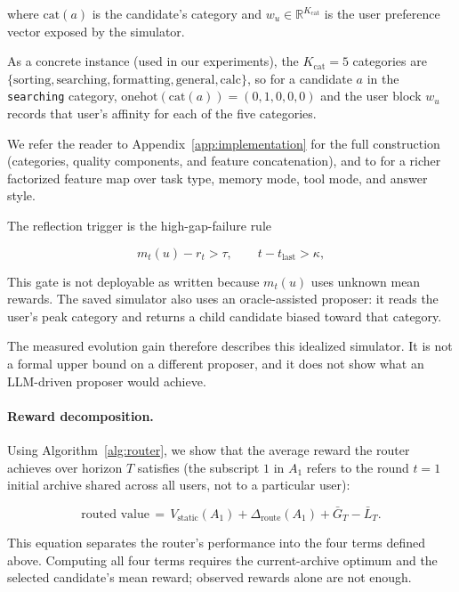 \documentclass{article} %
\begin{document}
where $\mathrm{cat}(a)$ is the candidate's category and $w_u \in \mathbb{R}^{K_{\mathrm{cat}}}$ is the user preference vector exposed by the simulator.

As a concrete instance (used in our experiments), the $K_{\mathrm{cat}}=5$ categories are $\{\text{sorting}, \text{searching}, \text{formatting}, \text{general}, \text{calc}\}$, so for a candidate $a$ in the \texttt{searching} category, $\mathrm{onehot}(\mathrm{cat}(a))=(0,1,0,0,0)$ and the user block $w_u$ records that user's affinity for each of the five categories.

We refer the reader to Appendix~\ref{app:implementation} for the full construction (categories, quality components, and feature concatenation), and to \citet{jin2026personalizing} for a richer factorized feature map over task type, memory mode, tool mode, and answer style.

The reflection trigger is the high-gap-failure rule

\begin{equation}
\label{eq:method-trigger}
m_t(u) - r_t > \tau,\qquad t - t_{\mathrm{last}} > \kappa,
\end{equation}

This gate is not deployable as written because $m_t(u)$ uses unknown mean rewards. The saved simulator also uses an oracle-assisted proposer: it reads the user's peak category and returns a child candidate biased toward that category.

The measured evolution gain therefore describes this idealized simulator. It is not a formal upper bound on a different proposer, and it does not show what an LLM-driven proposer would achieve.

\paragraph{Reward decomposition.}
Using Algorithm~\ref{alg:router}, we show that the average reward the router achieves over horizon $T$ satisfies (the subscript $1$ in $A_1$ refers to the round $t=1$ initial archive shared across all users, not to a particular user):

\begin{equation}
\label{eq:method-thesis}
\text{routed value}
\,=\, V_{\mathrm{static}}(A_1) + \Delta_{\mathrm{route}}(A_1) + \bar G_T - \bar L_T.
\end{equation}

This equation separates the router's performance into the four terms defined
above. Computing all four terms requires the current-archive optimum and the
selected candidate's mean reward; observed rewards alone are not enough.
\end{document}
